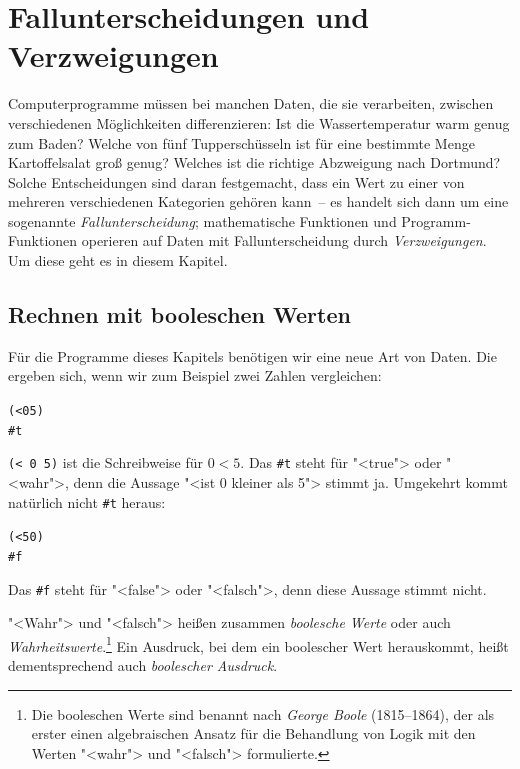 
\chapter{Fallunterscheidungen und Verzweigungen}
\label{cha:conditionals}

Computerprogramme müssen bei manchen Daten, die sie
verarbeiten, zwischen verschiedenen Möglichkeiten differenzieren: Ist
die Wassertemperatur warm genug zum Baden?  Welche von fünf
Tupperschüsseln ist für eine bestimmte Menge Kartoffelsalat groß
genug?  Welches ist die richtige Abzweigung nach Dortmund?  Solche
Entscheidungen sind daran festgemacht, dass ein Wert zu einer von mehreren
verschiedenen 
Kategorien gehören kann~-- es handelt sich dann um eine sogenannte
\textit{Fallunterscheidung}; 
mathematische Funktionen und Programm-Funktionen operieren auf Daten mit
Fallunterscheidung durch \textit{Verzweigungen}.
Um diese geht es in diesem Kapitel.

\section{Rechnen mit booleschen Werten}

Für die Programme dieses Kapitels benötigen wir eine neue Art von
Daten.  Die ergeben sich, wenn wir zum Beispiel zwei Zahlen
vergleichen:
%
\begin{alltt}
(< 0 5)
\evalsto{} #t
\end{alltt}
%
\texttt{(< 0 5)} ist die Schreibweise für $0 < 5$.  Das
\verb|#t| steht für "<true"> oder "<wahr">,
denn die Aussage "<ist 0 kleiner als 5"> stimmt ja.
Umgekehrt kommt natürlich nicht \verb|#t| heraus:
%
\begin{alltt}
(< 5 0)
\evalsto{} #f
\end{alltt}
%
Das \verb|#f| steht für "<false"> oder
"<falsch">, denn diese Aussage stimmt nicht.

"<Wahr"> und "<falsch"> heißen zusammen \textit{boolesche
  Werte} oder auch
\textit{Wahrheitswerte}.\footnote{Die booleschen
  Werte sind benannt nach \textit{George Boole} (1815--1864), der als
  erster einen algebraischen Ansatz für die Behandlung von Logik mit
  den Werten "<wahr"> und "<falsch"> formulierte.}  Ein Ausdruck, bei
dem ein boolescher Wert herauskommt, heißt dementsprechend auch
\textit{boolescher Ausdruck}.

